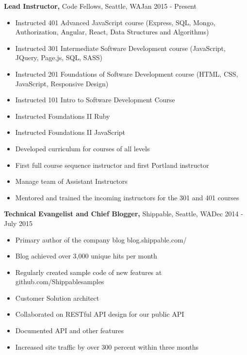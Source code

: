 \documentclass{res}
\begin{document}
\begin{resume}
  {\bf Lead Instructor,} Code Fellows, Seattle, WA\hfill Jan 2015 - Present
  \begin{itemize} \itemsep -2pt  %
    \item Instructed 401 Advanced JavaScript course (Express, SQL, Mongo, Authorization, Angular, React, Data Structures and Algorithms)
    \item Instructed 301 Intermediate Software Development course (JavaScript, JQuery, Page.js, SQL, SASS)
    \item Instructed 201 Foundations of Software Development course (HTML, CSS, JavaScript, Responsive Design)
    \item Instructed 101 Intro to Software Development Course
    \item Instructed Foundations II Ruby
    \item Instructed Foundations II JavaScript
    \item Developed curriculum for courses of all levels
    \item First full course sequence instructor and first Portland instructor
    \item Manage team of Assistant Instructors
    \item Mentored and trained the incoming instructors for the 301 and 401 courses
  \end{itemize}

  {\bf Technical Evangelist and Chief Blogger,} Shippable, Seattle, WA\hfill Dec 2014 - July 2015
  \begin{itemize} \itemsep -2pt  %
    \item Primary author of the company blog blog.shippable.com/
    \item Blog achieved over 3,000 unique hits per month
    \item Regularly created sample code of new features at github.com/Shippablesamples
    \item Customer Solution architect
    \item Collaborated on RESTful API design for our public API
    \item Documented API and other features
    \item Increased site traffic by over 300 percent within three months
  \end{itemize}


\end{resume}
\end{document}
